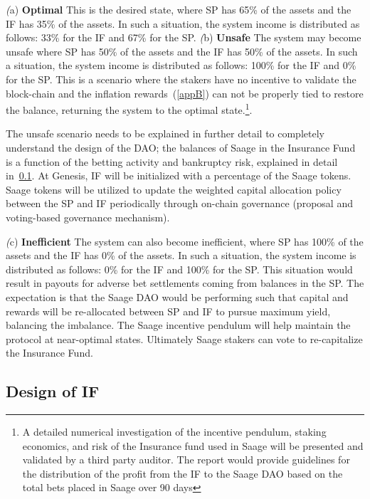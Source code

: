 \documentclass[%
 aapm,
 mph,%
 amsmath,amssymb,
 reprint,%
]{revtex4-2}
\begin{document}
\textit(a) \textbf{Optimal} This is the desired state, where SP has 65\% of the assets and the IF has 35\% of the assets. In such a situation, the system income is distributed as follows: 33\% for the IF and 67\% for the SP. 
\textit(b) \textbf{Unsafe} The system may become unsafe where SP has 50\% of the assets and the IF has 50\% of the assets. In such a situation, the system income is distributed as follows: 100\% for the IF and 0\% for the SP. This is a scenario where the stakers have no incentive to validate the block-chain and the inflation rewards~(\ref{appB}) can not be properly tied to restore the balance, returning the system to the optimal state.\footnote{A detailed numerical investigation of the incentive pendulum, staking economics, and risk of the Insurance fund used in Saage will be presented and validated by a third party auditor. The report would provide guidelines for the distribution of the profit from the IF to the Saage DAO based on the total bets placed in Saage over 90 days}. 


The unsafe scenario needs to be explained in further detail to completely understand the design of the DAO; the balances of Saage in the Insurance Fund is a function of the betting activity and bankruptcy risk, explained in detail in~\ref{slushfund}. At Genesis, IF will be initialized with a percentage of the Saage tokens. Saage tokens will be utilized to update the weighted capital allocation policy between the SP and IF periodically through on-chain governance (proposal and voting-based governance mechanism). 

\textit(c) \textbf{Inefficient} The system can also become inefficient, where SP has 100\% of the assets and the IF has 0\% of the assets. In such a situation, the system income is distributed as follows: 0\% for the IF and 100\% for the SP. This situation would result in payouts for adverse bet settlements coming from balances in the SP. The expectation is that the Saage DAO would be performing such that capital and rewards will be re-allocated between SP and IF to pursue maximum yield, balancing the imbalance. The Saage incentive pendulum will help maintain the protocol at near-optimal states.  Ultimately Saage stakers can vote to re-capitalize the Insurance Fund.

\subsection{Design of IF}\label{slushfund}
\end{document}
